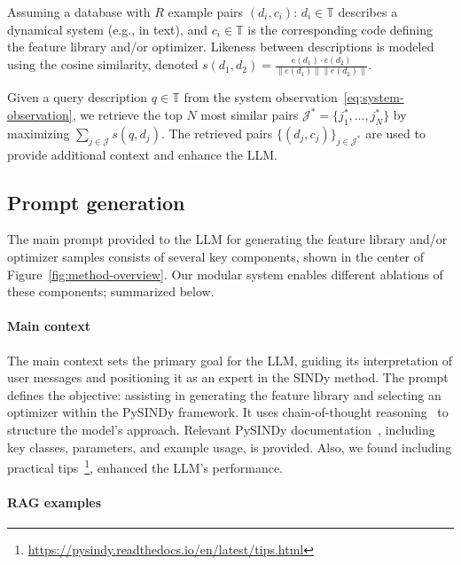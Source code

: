 \documentclass{article}
\begin{document}
Assuming a database with $R$ example pairs $(d_i, c_i)$: $d_i \in \mathbb{T}$ describes a dynamical system (e.g., in text), and $c_i \in \mathbb{T}$ is the corresponding code defining the feature library and/or optimizer. 
Likeness between descriptions is modeled using the cosine similarity, denoted $s(d_1, d_2) = \frac{e(d_1) \cdot e(d_2)}{\|e(d_1)\| \|e(d_2)\|}$.

Given a query description $q \in \mathbb{T}$ from the system observation~\eqref{eq:system-observation}, we retrieve the top $N$ most similar pairs $\mathcal{J}^*= \{j_1^*, \dots, j_N^*\}$ by maximizing $\sum_{j \in \mathcal{J}} s(q, d_j)$.
The retrieved pairs $\{(d_j, c_j)\}_{j \in \mathcal{J}^*}$ are used to provide additional context and enhance the LLM.

\subsection{Prompt generation}\label{sec:prompt-generation}

The main prompt provided to the LLM for generating the feature library and/or optimizer samples consists of several key components, shown in the center of Figure~\ref{fig:method-overview}. 
Our modular system enables different ablations of these components; summarized below.

\paragraph{Main context}

The main context sets the primary goal for the LLM, guiding its interpretation of user messages and positioning it as an expert in the SINDy method. 
The prompt defines the objective: assisting in generating the feature library and selecting an optimizer within the PySINDy framework. 
It uses chain-of-thought reasoning~\cite{wei2023chainofthoughtpromptingelicitsreasoning} to structure the model’s approach. 
Relevant PySINDy documentation~\cite{deSilva2020, Kaptanoglu2022}, including key classes, parameters, and example usage, is provided. 
Also, we found including practical tips~\footnote{\href{https://pysindy.readthedocs.io/en/latest/tips.html}{https://pysindy.readthedocs.io/en/latest/tips.html}}, enhanced the LLM's performance.

\paragraph{RAG examples}
\end{document}
